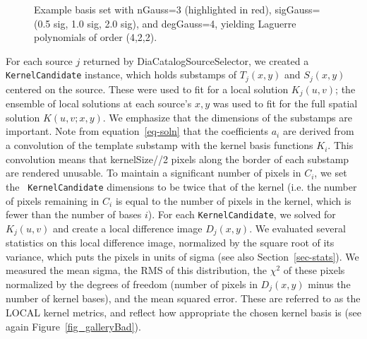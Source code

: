 \documentclass[prd, nofootinbib, floatfix, 11pt,tightenlines,times]{article}
\begin{document}
\begin{figure}
\caption{Example basis set with nGauss=3 (highlighted in red),
  sigGauss=(0.5 sig, 1.0 sig, 2.0 sig), and degGauss=4, yielding
  Laguerre polynomials of order (4,2,2).}
\label{basis}
\end{figure}

For each source $j$ returned by DiaCatalogSourceSelector, we created a
{\tt KernelCandidate} instance, which holds substamps of $T_j(x,y)$
and $S_j(x,y)$ centered on the source.  These were used to fit for a
local solution $K_j(u,v)$; the ensemble of local solutions at each
source's $x,y$ was used to fit for the full spatial solution
$K(u,v;x,y)$.  We emphasize that the dimensions of the substamps are
important.  Note from equation~\ref{eq-soln} that the coefficients
$a_i$ are derived from a convolution of the template substamp with the
kernel basis functions $K_i$.  This convolution means that
kernelSize//2 pixels along the border of each substamp are rendered unusable.
To maintain a significant number of pixels in $C_i$, we set the {\tt
  KernelCandidate} dimensions to be twice that of the kernel (i.e. the
number of pixels remaining in $C_i$ is equal to the number of pixels
in the kernel, which is fewer than the number of bases $i$).  For each
{\tt KernelCandidate}, we solved for $K_j(u,v)$ and create a local
difference image $D_j(x,y)$.  We evaluated several statistics on this
local difference image, normalized by the square root of its variance,
which puts the pixels in units of sigma (see also
Section~\ref{sec-stats}).  We measured the mean sigma, the RMS of this
distribution, the $\chi^2$ of these pixels normalized by the degrees
of freedom (number of pixels in $D_j(x,y)$ minus the number of kernel
bases), and the mean squared error.  These are referred to as the
LOCAL kernel metrics, and reflect how appropriate the chosen kernel
basis is (see again Figure~\ref{fig_galleryBad}).
\end{document}
